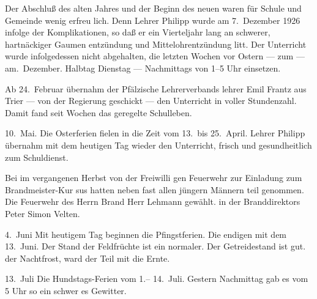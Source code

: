 

Der Abschluß des alten Jahres und der Beginn des\ob
neuen waren für Schule und Gemeinde wenig erfreu\ohb
lich. Denn Lehrer Philipp wurde am 7.\ Dezember 1926\ob
infolge der Komplikationen\unsicher, so daß er ein\ob
Vierteljahr lang an schwerer, hartnäckiger Gaumen\ohb
entzündung und Mittelohrentzündung litt. Der\ob
Unterricht wurde infolgedessen nicht\unsicher{} abgehalten, die\ob
letzten Wochen vor Ostern — zum\unsicher{} — am.\ Dezember. Halbtag Dienstag — Nachmittags von 1–5 Uhr\ob
einsetzen.

Ab 24.\ Februar übernahm der Pfälzische Lehrerverbands\ohb
lehrer Emil Frantz aus Trier — von der Regierung geschickt —\ob
den Unterricht in voller Stundenzahl. Damit fand seit Wochen\ob
das geregelte Schulleben\unsicher.

10.\ Mai.    Die Osterferien fielen in die Zeit vom 13.\ bis 25.\ April.\ob
Lehrer Philipp übernahm mit dem heutigen Tag\ob
wieder den Unterricht, frisch und gesundheitlich\unsicher\ob
zum Schuldienst.

Bei im vergangenen Herbst von der Freiwilli\ohb
gen Feuerwehr zur Einladung zum Brandmeister-Kur\ohb
sus hatten neben fast allen jüngern Männern teil\ohb
genommen\unsicher. Die\unsicher{} Feuerwehr\unsicher{} des\ob
Herrn Brand\unsicher{} Herr Lehmann\unsicher{} gewählt.\unsicher\ob
in der\unsicher{} Branddirektors\unsicher{} Peter Simon\unsicher\ob
Velten.\unsicher

4.\ Juni     Mit heutigem Tag beginnen die Pfingstferien. Die\ob
endigen mit dem 13.\ Juni.\ob
Der Stand der Feldfrüchte ist ein normaler. Der\ob
Getreidestand ist gut.\unsicher{} der Nachtfrost\unsicher, ward der\ob
\unsicher Teil mit die Ernte\unsicher.

13.\ Juli    Die Hundstags-Ferien vom 1.– 14.\ Juli.\ob
Gestern Nachmittag gab es vom 5 Uhr so ein schwer\ohb
es Gewitter\unsicher.
\pend
